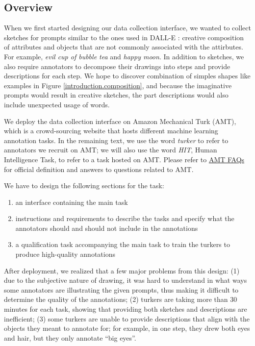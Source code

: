 \subsection{Overview}
When we first started designing our data collection interface, we wanted to collect sketches for prompts similar to the ones used in DALL-E \citep{dallePaper}: creative composition of attributes and objects that are not commonly associated with the attirbutes. For example, \textit{evil cup of bubble tea} and \textit{happy moon}. In addition to sketches, we also require annotators to decompose their drawings into steps and provide descriptions for each step. We hope to discover combination of simples shapes like examples in Figure \ref{introduction.composition}, and because the imaginative prompts would result in creative sketches, the part descriptions would also include unexpected usage of words.     

We deploy the data collection interface on Amazon Mechanical Turk (AMT), which is a crowd-sourcing website that hosts different machine learning annotation tasks. In the remaining text, we use the word \textit{turker} to refer to annotators we recruit on AMT; we will also use the word \textit{HIT}, Human Intelligence Task, to refer to a task hosted on AMT. Please refer to \href{https://www.mturk.com/worker/help#:~:text=A%20Human%20Intelligence%20Task%2C%20or,be%20completed%20by%20Worker%20customers.}{AMT FAQs} for official definition and answers to questions related to AMT. 
 
We have to design the following sections for the task: 
\begin{enumerate}
    \item \label{v1_sec_1} an interface containing the main task
    \item instructions and requirements to describe the tasks and specify what the annotators should and should not include in the annotations
    \item a qualification task accompanying the main task to train the turkers to produce high-quality annotations
\end{enumerate}
After deployment, we realized that a few major problems from this design: (1) due to the subjective nature of drawing, it was hard to understand in what ways some annotators are illustrating the given prompts, thus making it difficult to determine the quality of the annotations; (2) turkers are taking more than 30 minutes for each task, showing that providing both sketches and descriptions are inefficient; (3) some turkers are unable to provide descriptions that align with the objects they meant to annotate for; for example, in one step, they drew both eyes and hair, but they only annotate ``big eyes''.      

